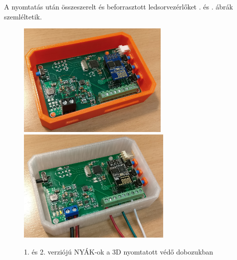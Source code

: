 \documentclass[../main.tex]{subfiles}
\begin{document}
            A nyomtatás után összeszerelt és beforrasztott ledsorvezérlőket . és . ábrák szemléltetik.
            
            \begin{figure}[h!]
                \centering
                    \includegraphics[height=5.5cm]{resources/pcb_res/printed_case_ngen}
                    \includegraphics[height=5.5cm]{resources/pcb_res/printed_case_abs}
                    \caption{1. és 2. verziójú NYÁK-ok a 3D nyomtatott védő dobozukban}
                    \label{fig:printed_cases_1}
            \end{figure}
            
\end{document}
